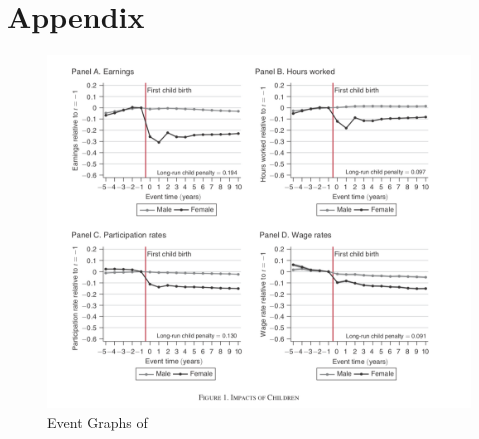 \section*{Appendix}

\listoffigures
\listoftables

\begin{figure}
    \centering
    \includegraphics[scale=0.3]{figures/kleven_10_years_impact.png}
    \caption{Event Graphs of \textcite{kleven_children_2019}}
    \label{fig:my_label}
\end{figure}